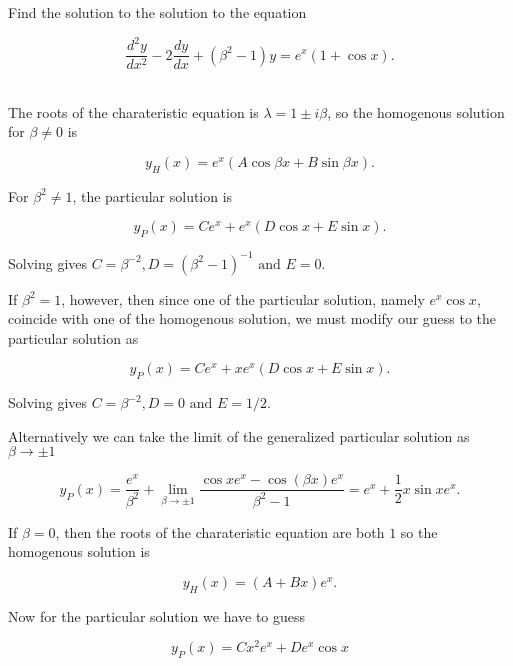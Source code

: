 \documentclass[english,a4paper,12pt]{report}
\begin{document}
{Find the solution to the solution to the equation 

\begin{equation}
    \frac{d^2y}{dx^2} - 2 \frac{dy}{dx} + (\beta ^2-1)y = e^{x}(1+\cos x). 
\end{equation}
~
}
{The roots of the charateristic equation is \(\lambda = 1 \pm i\beta \), so the homogenous solution for \(\beta \neq 0\) is 

\begin{equation}
    y_{H}(x) = e^{x}(A \cos \beta x + B \sin \beta x).  
\end{equation}

For \(\beta ^2 \neq 1 \), the particular solution is 

\begin{equation}
    y_{P}(x) = Ce^{x} + e^{x}(D \cos x + E\sin x).    
\end{equation}

Solving gives \(C = \beta ^{-2}, D = (\beta ^2-1)^{-1} \text { and } E = 0\). 

If \(\beta ^2 = 1\), however, then since one of the particular solution, namely \(e^{x} \cos x\), coincide with one of the homogenous solution, we must modify our guess to the particular solution as 

\begin{equation}
    y_{P}(x) = C e^{x} + xe^{x}(D \cos x + E \sin x).   
\end{equation}

Solving gives \(C = \beta ^{-2}, D = 0 \text { and } E = 1 /2 \).

Alternatively we can take the limit of the generalized particular solution as \(\beta \to \pm 1\) 

\begin{equation}
    y_{P}(x) = \frac{e^{x} }{\beta ^2}  + \lim_{\beta  \to \pm 1} \frac{\cos x e^{x} - \cos (\beta x)e^{x}  }{\beta ^2-1} =  e^{x}  + \frac{1}{2}x \sin x e^{x}.      
\end{equation}

If \(\beta = 0\), then the roots of the charateristic equation are both \(1\) so the homogenous solution is 

\begin{equation}
    y_{H}(x) =  (A+Bx)e^{x}. 
\end{equation}

Now for the particular solution we have to guess 

\begin{equation}
    y_{P}(x) = C x^2 e^{x} + D e^{x}\cos x   
\end{equation}

}
\end{document}
